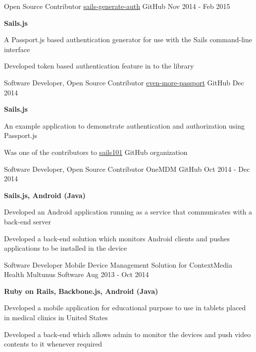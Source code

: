 \begin{cventries}
{\begin{cvitems}
      \end{cvitems}
    }
  \cventry
    {Open Source Contributor}
    {\href{https://github.com/kasperisager/sails-generate-auth}{sails-generate-auth}}
    {GitHub}
    {Nov 2014 - Feb 2015}
    {
      \begin{cvitems}
        \item {\textbf{Sails.js}}
        \item {A Passport.js based authentication generator for use with the Sails command-line interface}
        \item {Developed token based authentication feature in to the library}
      \end{cvitems}
    }
  \cventry
    {Software Developer, Open Source Contributor}
    {\href{https://github.com/sails101/even-more-passport/}{even-more-passport}}
    {GitHub}
    {Dec 2014}
    {
      \begin{cvitems}
        \item {\textbf{Sails.js}}
        \item {An example application to demonstrate authentication and authorization using Passport.js}
        \item {Was one of the contributors to \href{https://github.com/sails101}{sails101} GitHub organization}
      \end{cvitems}
    }
  \cventry
    {Software Developer, Open Source Contributor}
    {OneMDM}
    {GitHub}
    {Oct 2014 - Dec 2014}
    {
      \begin{cvitems}
        \item {\textbf{Sails.js, Android (Java)}}
        \item {Developed an Android application running as a service that communicates with a back-end server}
        \item {Developed a back-end solution which monitors Android clients and pushes applications to be installed in the device}
      \end{cvitems} 
    }
  \cventry
    {Software Developer}
    {Mobile Device Management Solution for ContextMedia Health}
    {Multunus Software}
    {Aug 2013 - Oct 2014}
    {
      \begin{cvitems}
        \item {\textbf{Ruby on Rails, Backbone.js, Android (Java)}}
        \item {Developed a mobile application for educational purpose to use in tablets placed in medical clinics in United States}
        \item {Developed a back-end which allows admin to monitor the devices and push video contents to it whenever required}

\end{cvitems}}
\end{cventries}
